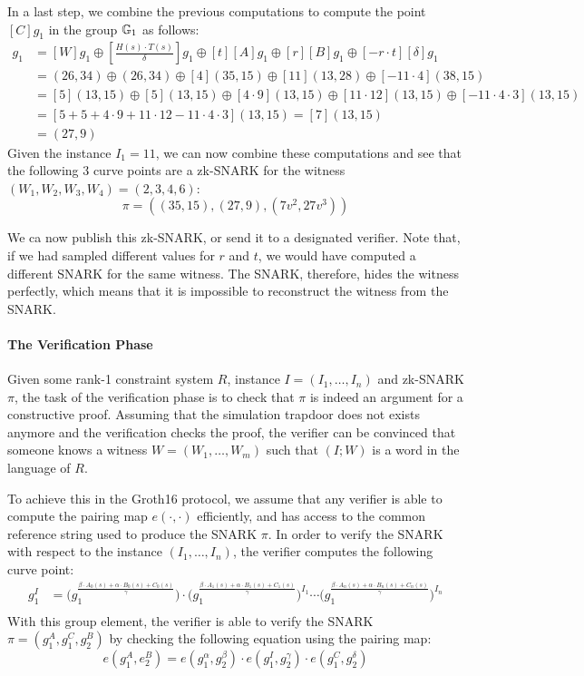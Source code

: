 \begin{example}
In a last step, we combine the previous computations to compute the point $[C]g_1$ in the group $\mathbb{G}_1$ as follows:
\begin{align*}
[C]g_1 & = [W]g_1\oplus [\frac{H(s)\cdot T(s)}{\delta}]g_1 \oplus [t][A]g_1 \oplus [r][B]g_1 \oplus [-r\cdot t][\delta]g_1\\
       & = (26,34)\oplus (26,34) \oplus [4](35,15) \oplus [11](13,28) \oplus [-11\cdot 4](38,15)\\       
       & = [5](13,15)\oplus [5](13,15) \oplus [4\cdot 9](13,15) \oplus [11\cdot 12](13,15) \oplus [-11\cdot 4\cdot 3](13,15)\\    
       & = [5+5+4\cdot 9+11\cdot 12-11\cdot 4\cdot 3](13,15)=[7](13,15)\\
       & = (27,9)
\end{align*}
Given the instance $I_1=11$, we can now combine these computations and see that the following $3$ curve points are a zk-SNARK for the witness $(W_1,W_2,W_3,W_4)=(2,3,4,6)$:
$$
\pi=((35,15),(27,9),(7v^2,27v^3))
$$

We ca now publish this zk-SNARK, or send it to a designated verifier. Note that, if we had sampled different values for $r$ and $t$, we would have computed a different SNARK for the same witness. The SNARK, therefore, hides the witness perfectly, which means that it is impossible to reconstruct the witness from the SNARK.
\end{example}

\paragraph{The Verification Phase}Given some rank-1 constraint system $R$, instance $I=(I_1,\ldots, I_n)$ and zk-SNARK $\pi$, the task of the verification phase is to check that $\pi$ is indeed an argument for a constructive proof. Assuming that the simulation trapdoor does not exists anymore and the verification checks the proof, the verifier can be convinced that someone knows a witness $W=(W_1,\ldots,W_m)$ such that  $(I;W)$ is a word in the language of $R$.  

To achieve this in the Groth16 protocol, we assume that any verifier is able to compute the pairing map $e(\cdot,\cdot)$ efficiently, and has access to the common reference string used to produce the SNARK $\pi$. In order to verify the SNARK with respect to the instance $(I_1,\ldots, I_n)$, the verifier computes the following curve point:
\begin{align*}
g_1^I & = \Big(g_1^{\frac{\beta\cdot A_{0}(s)+\alpha\cdot B_{0}(s)+C_{0}(s)}{\gamma}}\Big)\cdot \Big(g_1^{\frac{\beta\cdot A_{1}(s)+\alpha\cdot B_{1}(s)+C_{1}(s)}{\gamma}}\Big)^{I_1} \cdots \Big(g_1^{\frac{\beta\cdot A_{n}(s)+\alpha\cdot B_{n}(s)+C_{n}(s)}{\gamma}}\Big)^{I_n}\\
\end{align*}
With this group element, the verifier is able to verify the SNARK $\pi=(g_1^A,g_1^C,g_2^B)$ by checking the following equation using the pairing map:
\begin{equation}
e(g_1^A, e_2^B) = e(g_1^\alpha,g_2^\beta)\cdot e(g_1^I,g_2^\gamma)\cdot e(g_1^C,g_2^\delta)
\end{equation}

